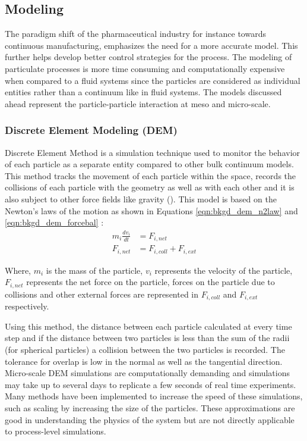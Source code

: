 \documentclass[preprint,11pt,authoryear]{elsarticle}
\begin{document}
\subsection{Modeling}
The paradigm shift of the pharmaceutical industry for instance towards continuous manufacturing, 
emphasizes the need for a more accurate model. This further helps develop better control strategies 
for the process. The modeling of particulate processes is more time consuming and computationally 
expensive when compared to a fluid systems since the particles are considered as individual entities 
rather than a continuum like in fluid systems. The models discussed ahead represent the 
particle-particle interaction at meso and micro-scale.
\subsubsection{Discrete Element Modeling (DEM)}
 Discrete Element Method is a simulation technique used to monitor the behavior of each particle 
as a separate entity compared to other bulk continuum models. This method tracks the movement of 
each particle within the space, records the collisions of each particle with the geometry as well 
as with each other and it is also subject to other force fields like gravity (\cite{Barrasso2015cerd}). This 
model is based on the Newton's laws of the motion as shown in Equations 
\ref{eqn:bkgd_dem_n2law} and  \ref{eqn:bkgd_dem_forcebal} : \\
\begin{align}
m_i\frac{dv_i}{dt} &= F_{i,net} \label{eqn:bkgd_dem_n2law} \\
F_{i,net} &=  F_{i,coll} +  F_{i,ext} \label{eqn:bkgd_dem_forcebal}
\end{align}

Where, $m_i$ is the mass of the particle, $v_i$ represents the velocity of 
the particle, $F_{i,net}$  represents the net force on the particle, forces on the particle due to collisions 
and other external forces are represented in $F_{i,coll}$ and $F_{i,ext}$ respectively.

Using this method, the distance between each particle calculated at every time step and if the distance between two 
particles is less than the sum of the radii (for spherical particles)  a collision between the two particles 
is recorded. The tolerance for overlap is low in the normal as well as the tangential direction. 
Micro-scale DEM simulations are computationally demanding and simulations may take up to several 
days to replicate a few seconds of real time experiments. Many methods have been implemented to 
increase the speed of these simulations, such as scaling by increasing the size of the particles. These 
approximations are good in understanding the physics of the system but are not directly applicable to 
process-level simulations. 
\end{document}
